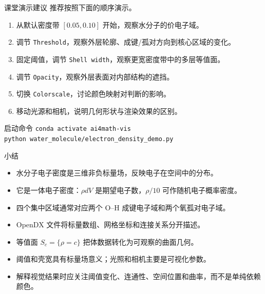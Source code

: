 \documentclass[aspectratio=169,11pt]{ctexbeamer}
\begin{document}
\begin{frame}{课堂演示建议}
  推荐按照下面的顺序演示。

  \begin{enumerate}
    \item 从默认密度带 $[0.05,0.10]$ 开始，观察水分子的价电子域。
    \item 调节 \texttt{Threshold}，观察外层轮廓、成键/孤对方向到核心区域的变化。
    \item 固定阈值，调节 \texttt{Shell width}，观察更宽密度带中的多层等值面。
    \item 调节 \texttt{Opacity}，观察外层表面对内部结构的遮挡。
    \item 切换 \texttt{Colorscale}，讨论颜色映射对判断的影响。
    \item 移动光源和相机，说明几何形状与渲染效果的区别。
  \end{enumerate}

  \begin{block}{启动命令}
    \texttt{conda activate ai4math-vis}\\
    \texttt{python water\_molecule/electron\_density\_demo.py}
  \end{block}
\end{frame}

\begin{frame}{小结}
  \begin{itemize}
    \item 水分子电子密度是三维非负标量场，反映电子在空间中的分布。
    \item 它是一体电子密度：$\rho dV$ 是期望电子数，$\rho/10$ 可作随机电子概率密度。
    \item 四个集中区域通常对应两个 O--H 成键电子域和两个氧孤对电子域。
    \item OpenDX 文件将标量数组、网格坐标和连接关系分开描述。
    \item 等值面 $S_c=\{\rho=c\}$ 把体数据转化为可观察的曲面几何。
    \item 阈值和壳宽具有标量场意义；光照和相机主要是可视化参数。
    \item 解释视觉结果时应关注阈值变化、连通性、空间位置和曲率，而不是单纯依赖颜色。
  \end{itemize}
\end{frame}
\end{document}
